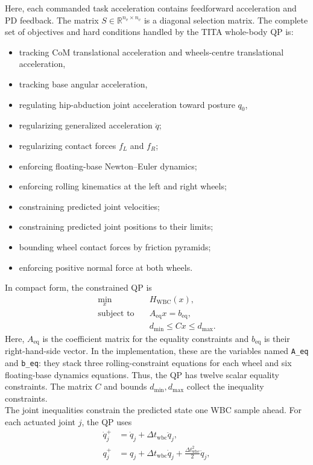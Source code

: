 Here, each commanded task acceleration contains feedforward acceleration and
PD feedback. The matrix $S\in\mathbb{R}^{n_v\times n_v}$ is a diagonal
selection matrix. The complete set of objectives and hard conditions handled by the
TITA whole-body QP is:
\begin{itemize}
    \item tracking CoM translational acceleration and wheels-centre translational acceleration, 
    \item tracking base angular acceleration, 
    \item regulating hip-abduction joint acceleration toward posture $q_0$,
    \item regularizing generalized acceleration $\ddot{q}$;
    \item regularizing contact forces $f_L$ and $f_R$;
    \item enforcing floating-base Newton--Euler dynamics;
    \item enforcing rolling kinematics at the left and right wheels;
    \item constraining predicted joint velocities;
    \item constraining predicted joint positions to their limits;
    \item bounding wheel contact forces by friction pyramids;
    \item enforcing positive normal force at both wheels.
\end{itemize}
In compact form, the constrained QP is
\[
    \begin{aligned}
        \min_x\quad & H_{\mathrm{WBC}}(x),\\
        \text{subject to}\quad & A_{\mathrm{eq}}x=b_{\mathrm{eq}},\\
        & d_{\min}\le Cx\le d_{\max}.
    \end{aligned}
\]
Here, $A_{\mathrm{eq}}$ is the coefficient matrix for the equality constraints
and $b_{\mathrm{eq}}$ is their right-hand-side vector. In the implementation,
these are the variables named \texttt{A\_eq} and \texttt{b\_eq}: they stack
three rolling-constraint equations for each wheel and six floating-base
dynamics equations. Thus, the QP has twelve scalar equality
constraints. The matrix $C$ and bounds $d_{\min},d_{\max}$ collect the
inequality constraints.\\
The joint inequalities constrain the predicted state one WBC sample ahead.
For each actuated joint $j$, the QP uses
\[
\begin{aligned}
    \dot{q}_{j}^{+}
        &= \dot{q}_{j}+\Delta t_{\mathrm{wbc}}\ddot{q}_{j},\\
    q_{j}^{+}
        &= q_{j}+\Delta t_{\mathrm{wbc}}\dot{q}_{j}
           +\frac{\Delta t_{\mathrm{wbc}}^{2}}{2}\ddot{q}_{j},
\end{aligned}
\]
